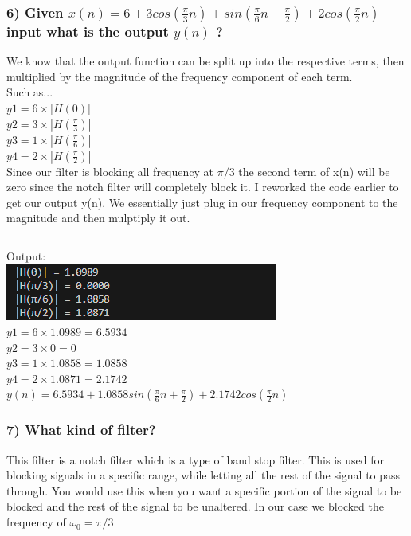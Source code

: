 \documentclass[12pt,letterpaper]{article}
\begin{document}
\subsubsection*{6) Given $x(n) = 6 + 3 cos(\frac{\pi}{3}n) + sin(\frac{\pi}{6}n + \frac{\pi}{2}) + 2 cos(\frac{\pi}{2}n)$  input what is the output $y(n)$ ? }
We know that the output function can be split up into the respective terms, then multiplied by the magnitude of the frequency component of each term.\\
Such as...\\
$y1 = 6 \times |H(0)|$ \\
$y2 = 3 \times |H(\frac{\pi}{3})|$ \\
$y3 = 1 \times |H(\frac{\pi}{6})|$ \\ 
$y4 = 2 \times |H(\frac{\pi}{2})|$ \\
Since our filter is blocking all frequency at $\pi/3$ the second term of x(n) will be zero since the notch filter will completely block it. I reworked the code earlier to get our output y(n). We essentially just plug in our frequency component to the magnitude and then mulptiply it out.
\inputminted[frame=lines,framesep=2mm,baselinestretch=1.2,bgcolor=LightGray,breaklines,fontsize=\tiny,linenos]{python}{p1p6.py}
Output:\\
\includegraphics*[scale=1]{p1p6.png} \\
$y1 = 6 \times 1.0989 = 6.5934$ \\
$y2 = 3 \times 0 = 0$ \\
$y3 = 1 \times 1.0858 = 1.0858$ \\ 
$y4 = 2 \times 1.0871 = 2.1742$ \\
$y(n) = 6.5934 + 1.0858 sin(\frac{\pi}{6} n + \frac{\pi}{2}) + 2.1742 cos(\frac{\pi}{2} n)$
\subsubsection*{7) What kind of filter?}
This filter is a notch filter which is a type of band stop filter. This is used for blocking signals in a specific range, while letting all the rest of the signal to pass through. You would use this when you want a specific portion of the signal to be blocked and the rest of the signal to be unaltered. In our case we blocked the frequency of $\omega_0 = \pi/3$
\end{document}

